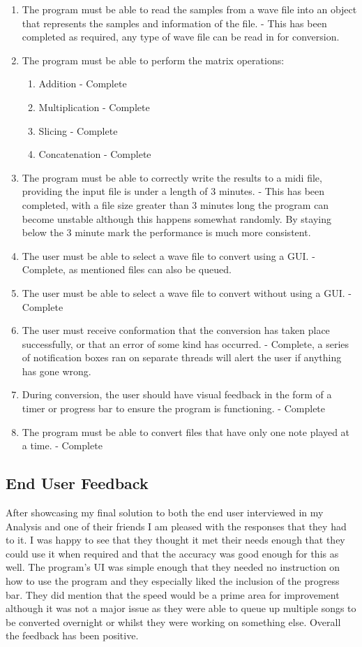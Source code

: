 \documentclass[12pt]{report}
\begin{document}
\begin{enumerate}
    \item The program must be able to read the samples from a wave file into an object that represents the samples and information of the file. - This has been completed as required, any type of wave file can be read in for conversion.
    \item The program must be able to perform the matrix operations:
    \begin{enumerate}
        \item Addition - Complete
        \item Multiplication - Complete
        \item Slicing - Complete
        \item Concatenation - Complete
    \end{enumerate}
    \item The program must be able to correctly write the results to a midi file, providing the input file is under a length of 3 minutes. - This has been completed, with a file size greater than 3 minutes long the program can become unstable although this happens somewhat randomly. By staying below the 3 minute mark the performance is much more consistent. 
    \item The user must be able to select a wave file to convert using a GUI. - Complete, as mentioned files can also be queued.
    \item The user must be able to select a wave file to convert without using a GUI. - Complete
    \item The user must receive conformation that the conversion has taken place successfully, or that an error of some kind has occurred. - Complete, a series of notification boxes ran on separate threads will alert the user if anything has gone wrong.
    \item During conversion, the user should have visual feedback in the form of a timer or progress bar to ensure the program is functioning. - Complete
    \item The program must be able to convert files that have only one note played at a time. - Complete
\end{enumerate}

\subsection*{End User Feedback}
After showcasing my final solution to both the end user interviewed in my Analysis and one of their friends I am pleased with the responses that they had to it. I was happy to see that they thought it met their needs enough that they could use it when required and that the accuracy was good enough for this as well. The program's UI was simple enough that they needed no instruction on how to use the program and they especially liked the inclusion of the progress bar. They did mention that the speed would be a prime area for improvement although it was not a major issue as they were able to queue up multiple songs to be converted overnight or whilst they were working on something else. Overall the feedback has been positive.
\end{document}
